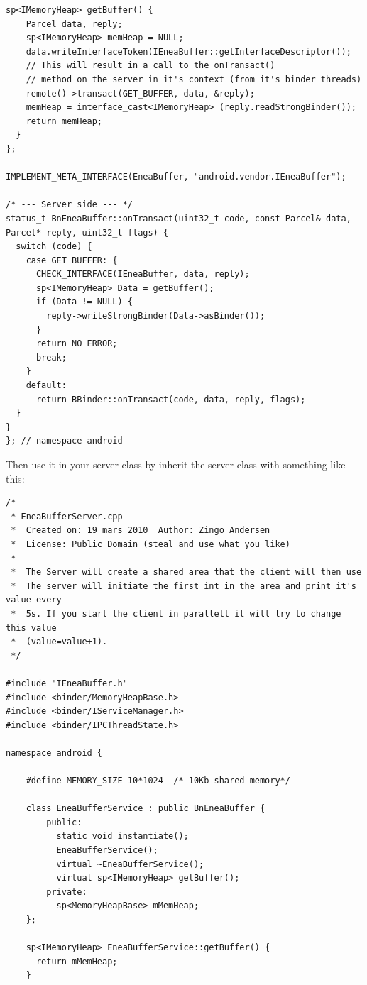 \documentclass[a4paper,11pt]{article}
\begin{document}
\begin{appendices}
\begin{lstlisting}[caption=Interface class: IEneaBuffer.cpp, label=IEneaBufferCPP]
  sp<IMemoryHeap> getBuffer() {
    Parcel data, reply;
    sp<IMemoryHeap> memHeap = NULL;
    data.writeInterfaceToken(IEneaBuffer::getInterfaceDescriptor());
    // This will result in a call to the onTransact()
    // method on the server in it's context (from it's binder threads)
    remote()->transact(GET_BUFFER, data, &reply);
    memHeap = interface_cast<IMemoryHeap> (reply.readStrongBinder());
    return memHeap;
  }
};

IMPLEMENT_META_INTERFACE(EneaBuffer, "android.vendor.IEneaBuffer");

/* --- Server side --- */
status_t BnEneaBuffer::onTransact(uint32_t code, const Parcel& data, Parcel* reply, uint32_t flags) {
  switch (code) {
    case GET_BUFFER: {
      CHECK_INTERFACE(IEneaBuffer, data, reply);
      sp<IMemoryHeap> Data = getBuffer();
      if (Data != NULL) {
        reply->writeStrongBinder(Data->asBinder());
      }
      return NO_ERROR;
      break;
    }
    default:
      return BBinder::onTransact(code, data, reply, flags);
  }
}
}; // namespace android
\end{lstlisting}


Then use it in your server class by inherit the server class with something
like this:


\begin{lstlisting}[caption=Server command: EneaBufferServer.cpp,
    label={EneaBufferServer}]
/*
 * EneaBufferServer.cpp
 *  Created on: 19 mars 2010  Author: Zingo Andersen
 *  License: Public Domain (steal and use what you like)
 *
 *  The Server will create a shared area that the client will then use
 *  The server will initiate the first int in the area and print it's value every
 *  5s. If you start the client in parallell it will try to change this value
 *  (value=value+1).
 */

#include "IEneaBuffer.h"
#include <binder/MemoryHeapBase.h>
#include <binder/IServiceManager.h>
#include <binder/IPCThreadState.h>

namespace android {

    #define MEMORY_SIZE 10*1024  /* 10Kb shared memory*/

    class EneaBufferService : public BnEneaBuffer {
        public:
          static void instantiate();
          EneaBufferService();
          virtual ~EneaBufferService();
          virtual sp<IMemoryHeap> getBuffer();
        private:
          sp<MemoryHeapBase> mMemHeap;
    };

    sp<IMemoryHeap> EneaBufferService::getBuffer() {
      return mMemHeap;
    }


\end{lstlisting}
\end{appendices}
\end{document}
